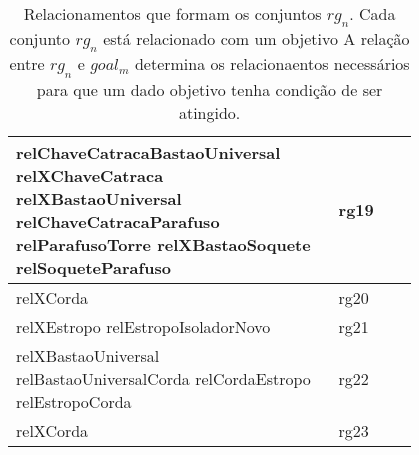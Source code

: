 \begin{table}[H]
\begin{tabular}{|p{0.8\linewidth}|l|}
relChaveCatracaBastaoUniversal relXChaveCatraca relXBastaoUniversal relChaveCatracaParafuso relParafusoTorre relXBastaoSoquete relSoqueteParafuso                                                                                                                                                                                           & rg19        \\ \hline
relXCorda                                                                                                                                                                                                                                                                                                                                 & rg20        \\ \hline
relXEstropo relEstropoIsoladorNovo                                                                                                                                                                                                                                                                                                         & rg21        \\ \hline
relXBastaoUniversal relBastaoUniversalCorda relCordaEstropo relEstropoCorda                                                                                                                                                                                                                                                                & rg22        \\ \hline
relXCorda                                                                                                                                                                                                                                                                                                                                 & rg23        \\ \hline
\end{tabular}
\caption{Relacionamentos que formam os conjuntos $rg_n$. Cada conjunto $rg_n$ está relacionado com um objetivo A relação entre $rg_n$ e $goal_m$ determina os relacionaentos necessários para que um dado objetivo tenha condição de ser atingido.}
\label{relationsgroup1}
\end{table}


